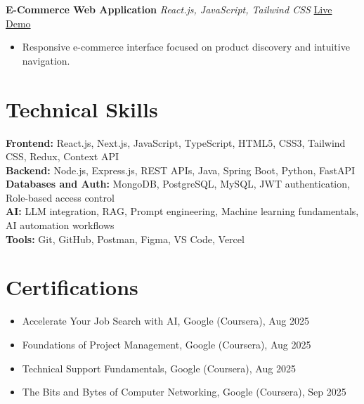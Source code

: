 \documentclass[10.5pt,letterpaper]{article}
\begin{document}
\textbf{E-Commerce Web Application} \textbar{} \textit{React.js, JavaScript, Tailwind CSS} \hfill \href{https://apexcify-technologys-ecom-website.vercel.app/}{Live Demo}
\begin{itemize}
\item Responsive e-commerce interface focused on product discovery and intuitive navigation.
\end{itemize}

\section*{Technical Skills}
\textbf{Frontend:} React.js, Next.js, JavaScript, TypeScript, HTML5, CSS3, Tailwind CSS, Redux, Context API\\
\textbf{Backend:} Node.js, Express.js, REST APIs, Java, Spring Boot, Python, FastAPI\\
\textbf{Databases and Auth:} MongoDB, PostgreSQL, MySQL, JWT authentication, Role-based access control\\
\textbf{AI:} LLM integration, RAG, Prompt engineering, Machine learning fundamentals, AI automation workflows\\
\textbf{Tools:} Git, GitHub, Postman, Figma, VS Code, Vercel\\

\section*{Certifications}
\begin{itemize}
\item Accelerate Your Job Search with AI, Google (Coursera), Aug 2025
\item Foundations of Project Management, Google (Coursera), Aug 2025
\item Technical Support Fundamentals, Google (Coursera), Aug 2025
\item The Bits and Bytes of Computer Networking, Google (Coursera), Sep 2025
\end{itemize}
\end{document}
